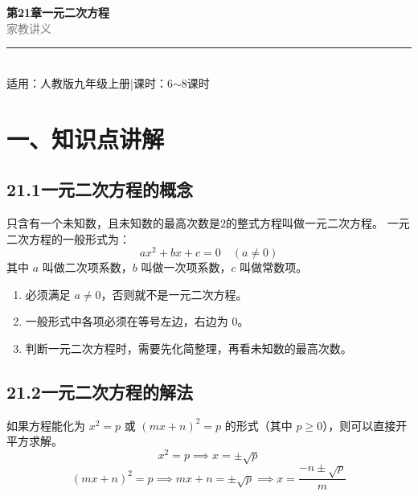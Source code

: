 \documentclass[12pt, a4paper]{ctexart}
\begin{document}
\begin{center}
{\Huge\bfseries\textcolor{mainblue}{第21章\quad 一元二次方程}}\\[12pt]
{\Large\textcolor{gray}{家\quad 教\quad 讲\quad 义}}\\[8pt]
\rule{0.6\textwidth}{1pt}\\[8pt]
{\normalsize 适用：人教版九年级上册\quad |\quad 课时：6$\sim$8课时}
\end{center}
\vspace{10pt}

\section*{\textcolor{mainblue}{一、知识点讲解}}

\subsection*{21.1\quad 一元二次方程的概念}

\begin{knowledgebox}[一元二次方程的定义]
只含有一个未知数，且未知数的最高次数是$2$的整式方程叫做一元二次方程。
\medskip
一元二次方程的一般形式为：
\[
\boxed{ax^2 + bx + c = 0 \quad (a \neq 0)}
\]
其中 $a$ 叫做二次项系数，$b$ 叫做一次项系数，$c$ 叫做常数项。
\end{knowledgebox}

\begin{warnbox}[易错提醒]
\begin{enumerate}[leftmargin=*]
  \item 必须满足 $a \neq 0$，否则就不是一元二次方程。
  \item 一般形式中各项必须在等号左边，右边为 $0$。
  \item 判断一元二次方程时，需要先化简整理，再看未知数的最高次数。
\end{enumerate}
\end{warnbox}

\subsection*{21.2\quad 一元二次方程的解法}

\begin{knowledgebox}
如果方程能化为 $x^2 = p$ 或 $(mx+n)^2 = p$ 的形式（其中 $p \geqslant 0$），则可以直接开平方求解。
\[
x^2 = p \implies x = \pm\sqrt{p}
\]
\[
(mx+n)^2 = p \implies mx+n = \pm\sqrt{p} \implies x = \frac{-n \pm \sqrt{p}}{m}
\]
\end{knowledgebox}
\end{document}
